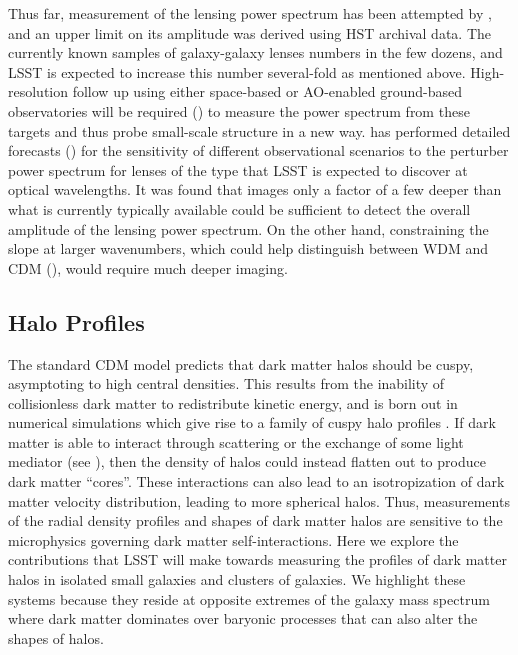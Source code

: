 \documentclass[modern,linenumbers]{aastex62}
\begin{document}
Thus far, measurement of the lensing power spectrum has been attempted by \cite{Bayer:2018vhy}, and an upper limit on its amplitude was derived using HST archival data. The currently known samples of galaxy-galaxy lenses numbers in the few dozens, and LSST is expected to increase this number several-fold as mentioned above. High-resolution follow up using either space-based or AO-enabled ground-based observatories will be required () to measure the power spectrum from these targets and thus probe small-scale structure in a new way. \citet{Cyr-Racine:2018htu} has performed detailed forecasts () for the sensitivity of different observational scenarios to the perturber power spectrum for lenses of the type that LSST is expected to discover at optical wavelengths. It was found that images only a factor of a few deeper than what is currently typically available \citep[\eg, from the SLACS sample][]{Bolton2008} could be sufficient to detect the overall amplitude of the lensing power spectrum. On the other hand, constraining the slope at larger wavenumbers, which could help distinguish between WDM and CDM (), would require much deeper imaging.

\subsection{Halo Profiles} 

The standard CDM model predicts that dark matter halos should be cuspy, asymptoting to high central densities.
This results from the inability of collisionless dark matter to redistribute kinetic energy, and is born out in numerical simulations which give rise to a family of cuspy halo profiles \citep[\eg, the NFW profile,][]{Navarro:1998}.
If dark matter is able to interact through scattering or the exchange of some light mediator (see ), then the density of halos could instead flatten out to produce dark matter ``cores''.
These interactions can also lead to an isotropization of dark matter velocity distribution, leading to more spherical halos.
Thus, measurements of the radial density profiles and shapes of dark matter halos are sensitive to the microphysics governing dark matter self-interactions.
Here we explore the contributions that LSST will make towards measuring the profiles of dark matter halos in isolated small galaxies and clusters of galaxies.
We highlight these systems because they reside at opposite extremes of the galaxy mass spectrum where dark matter dominates over baryonic processes that can also alter the shapes of halos.
\end{document}

